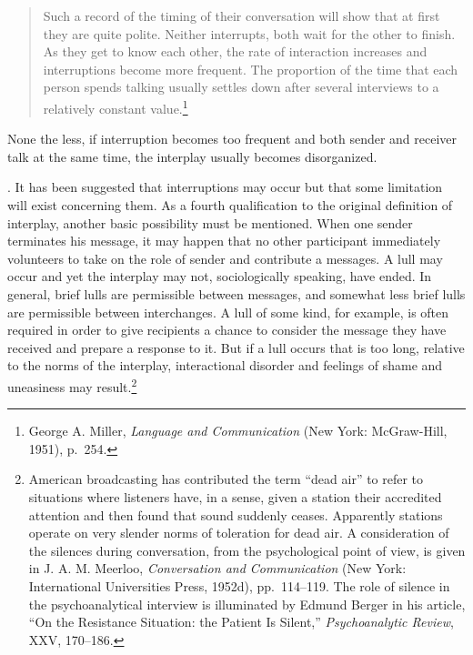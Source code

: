 \documentclass[openany,nobib]{tufte-book}
\begin{document}
\begin{quote}
Such a record of the timing of their conversation will show that at
first they are quite polite. Neither interrupts, both wait for the other
to finish. As they get to know each other, the rate of interaction
increases and interruptions become more frequent. The proportion of the
time that each person spends talking usually settles down after several
interviews to a relatively constant value.\footnote{George A. Miller,
  \emph{Language and Communication} (New York: McGraw-Hill, 1951),
  p.~254.}
\end{quote}

\noindent None the less, if interruption becomes too frequent and both sender and
receiver talk at the same time, the interplay usually becomes
disorganized.

. It has been suggested that interruptions may occur but that some
limitation will exist concerning them. As a fourth qualification to the
original definition of interplay, another basic possibility must be
mentioned. When one sender terminates his message, it may happen that no
other participant immediately volunteers to take on the role of sender
and contribute a messages. A lull may occur and yet the interplay may
not, sociologically speaking, have ended. In general, brief lulls are
permissible between messages, and somewhat less brief lulls are
permissible between interchanges. A lull of some kind, for example, is
often required in order to give recipients a chance to consider the
message they have received and prepare a response to it. But if a lull
occurs that is too long, relative to the norms of the interplay,
interactional disorder and feelings of shame and uneasiness may
result.\footnote{American broadcasting has contributed the term ``dead
  air'' to refer to situations where listeners have, in a sense, given a
  station their accredited attention and then found that sound suddenly
  ceases. Apparently stations operate on very slender norms of
  toleration for dead air. A consideration of the silences during
  conversation, from the psychological point of view, is given in J. A.
  M. Meerloo, \emph{Conversation and Communication} (New York:
  International Universities Press, 1952d), pp.~114--119. The role of
  silence in the psychoanalytical interview is illuminated by Edmund
  Berger in his article, ``On the Resistance Situation: the Patient Is
  Silent,'' \emph{Psychoanalytic Review}, XXV, 170--186.}

\enlargethispage{\baselineskip}
\end{document}
